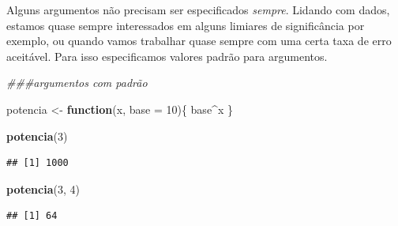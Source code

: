 \documentclass[
]{article}
\newenvironment{Shaded}{\begin{snugshade}}{\end{snugshade}}
\newcommand{\CommentTok}[1]{\textcolor[rgb]{0.56,0.35,0.01}{\textit{#1}}}
\newcommand{\ControlFlowTok}[1]{\textcolor[rgb]{0.13,0.29,0.53}{\textbf{#1}}}
\newcommand{\DataTypeTok}[1]{\textcolor[rgb]{0.13,0.29,0.53}{#1}}
\newcommand{\DecValTok}[1]{\textcolor[rgb]{0.00,0.00,0.81}{#1}}
\newcommand{\KeywordTok}[1]{\textcolor[rgb]{0.13,0.29,0.53}{\textbf{#1}}}
\newcommand{\NormalTok}[1]{#1}
\newcommand{\OperatorTok}[1]{\textcolor[rgb]{0.81,0.36,0.00}{\textbf{#1}}}
\newcommand{\StringTok}[1]{\textcolor[rgb]{0.31,0.60,0.02}{#1}}
\begin{document}
Alguns argumentos não precisam ser especificados \emph{sempre}. Lidando
com dados, estamos quase sempre interessados em alguns limiares de
significância por exemplo, ou quando vamos trabalhar quase sempre com
uma certa taxa de erro aceitável. Para isso especificamos valores padrão
para argumentos.

\begin{Shaded}
\begin{Highlighting}[]
\CommentTok{###argumentos com padrão}

\NormalTok{potencia <-}\StringTok{ }\ControlFlowTok{function}\NormalTok{(x, }\DataTypeTok{base =} \DecValTok{10}\NormalTok{)\{}
\NormalTok{  base}\OperatorTok{^}\NormalTok{x}
\NormalTok{\}}

\KeywordTok{potencia}\NormalTok{(}\DecValTok{3}\NormalTok{)}
\end{Highlighting}
\end{Shaded}

\begin{verbatim}
## [1] 1000
\end{verbatim}

\begin{Shaded}
\begin{Highlighting}[]
\KeywordTok{potencia}\NormalTok{(}\DecValTok{3}\NormalTok{, }\DecValTok{4}\NormalTok{)}
\end{Highlighting}
\end{Shaded}

\begin{verbatim}
## [1] 64
\end{verbatim}
\end{document}
